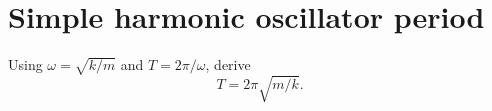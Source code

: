 %
%
%
%

\section*{Simple harmonic oscillator period}
Using $\omega=\sqrt{k/m}$ and $T=2\pi/\omega$, derive
\[
  T=2\pi\sqrt{m/k}.
\]
